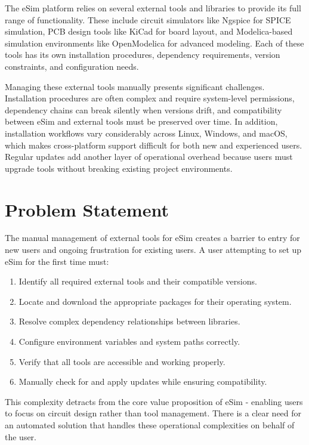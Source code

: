 \documentclass[12pt,a4paper]{report}
\begin{document}
The eSim platform relies on several external tools and libraries to provide its full range of functionality. These include circuit simulators like Ngspice for SPICE simulation, PCB design tools like KiCad for board layout, and Modelica-based simulation environments like OpenModelica for advanced modeling. Each of these tools has its own installation procedures, dependency requirements, version constraints, and configuration needs.

Managing these external tools manually presents significant challenges. Installation procedures are often complex and require system-level permissions, dependency chains can break silently when versions drift, and compatibility between eSim and external tools must be preserved over time. In addition, installation workflows vary considerably across Linux, Windows, and macOS, which makes cross-platform support difficult for both new and experienced users. Regular updates add another layer of operational overhead because users must upgrade tools without breaking existing project environments.

\section{Problem Statement}
The manual management of external tools for eSim creates a barrier to entry for new users and ongoing frustration for existing users. A user attempting to set up eSim for the first time must:
\begin{enumerate}
    \item Identify all required external tools and their compatible versions.
    \item Locate and download the appropriate packages for their operating system.
    \item Resolve complex dependency relationships between libraries.
    \item Configure environment variables and system paths correctly.
    \item Verify that all tools are accessible and working properly.
    \item Manually check for and apply updates while ensuring compatibility.
\end{enumerate}

This complexity detracts from the core value proposition of eSim - enabling users to focus on circuit design rather than tool management. There is a clear need for an automated solution that handles these operational complexities on behalf of the user.
\end{document}
